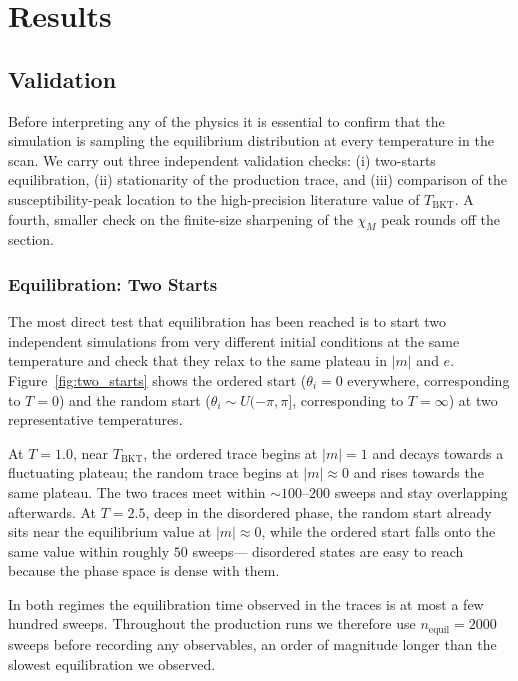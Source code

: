 \documentclass[11pt,a4paper]{article}
\begin{document}
\section{Results}
\label{sec:results}

\subsection{Validation}
\label{sec:validation}

Before interpreting any of the physics it is essential to confirm that the simulation is sampling the equilibrium distribution at every temperature in the scan. We carry out three independent validation checks: (i) two-starts equilibration, (ii) stationarity of the production trace, and (iii) comparison of the susceptibility-peak location to the high-precision literature value of $T_{\mathrm{BKT}}$. A fourth, smaller check on the finite-size sharpening of the $\chi_M$ peak rounds off the section.

\subsubsection{Equilibration: Two Starts}
\label{sec:two_starts}

The most direct test that equilibration has been reached is to start two independent simulations from very different initial conditions at the same temperature and check that they relax to the same plateau in $|m|$ and $e$. Figure~\ref{fig:two_starts} shows the ordered start ($\theta_i = 0$ everywhere, corresponding to $T = 0$) and the random start ($\theta_i \sim U(-\pi, \pi]$, corresponding to $T = \infty$) at two representative temperatures.

At $T = 1.0$, near $T_{\mathrm{BKT}}$, the ordered trace begins at $|m| = 1$ and decays towards a fluctuating plateau; the random trace begins at $|m| \approx 0$ and rises towards the same plateau. The two traces meet within $\sim 100$--$200$ sweeps and stay overlapping afterwards. At $T = 2.5$, deep in the disordered phase, the random start already sits near the equilibrium value at $|m| \approx 0$, while the ordered start falls onto the same value within roughly $50$ sweeps--- disordered states are easy to reach because the phase space is dense with them.

In both regimes the equilibration time observed in the traces is at most a few hundred sweeps. Throughout the production runs we therefore use $n_{\mathrm{equil}} = 2000$ sweeps before recording any observables, an order of magnitude longer than the slowest equilibration we observed.
\end{document}
